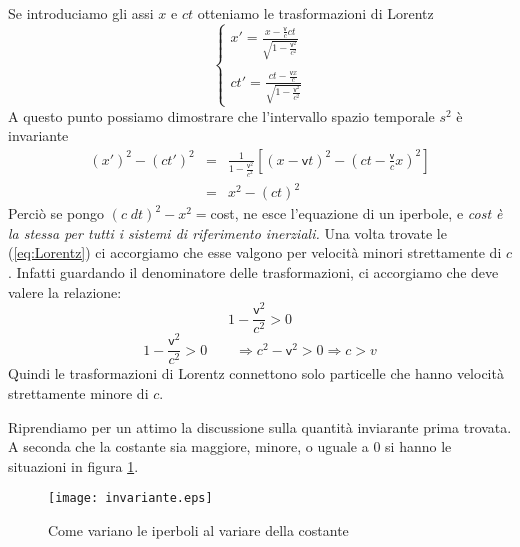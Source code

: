 Se introduciamo gli assi $x$ e $ct$ otteniamo le trasformazioni di
Lorentz 
\begin{equation}
  \left\{\begin{array}{l}
      x'=\frac{x-\frac{\mathsf{v}}{c}ct}{\sqrt{1-\frac{\mathsf{v}^2}{c^2}}}
      \\
      \mbox{ }\\
      ct'=\frac{ct-\frac{\mathsf{v}x}{c}}{\sqrt{1-\frac{\mathsf{v}^2}{c^2}}}
    \end{array}\right.\label{eq:Lorentz}
\end{equation}
A questo punto possiamo dimostrare che l'intervallo spazio temporale
$s^2$ \`e invariante
\begin{eqnarray*}
  (x')^2 - (ct')^2 & = &
  \frac{1}{1-\frac{\mathsf{v}^2}{c^2}}
  \left[(x-\mathsf{v}t)^2-(ct-\frac{\mathsf{v}}{c}x)^2\right]\\
  & = & x^2-(ct)^2
\end{eqnarray*}
Perci\`o se pongo $(c\;dt)^2-x^2=$cost, ne esce l'equazione di un
iperbole, e \emph{cost \`e la stessa per tutti i sistemi di
  riferimento inerziali.} Una volta trovate le (\ref{eq:Lorentz}) ci
accorgiamo che esse valgono per velocit\`a minori strettamente di
$c$. Infatti guardando il denominatore delle trasformazioni, ci
accorgiamo che deve valere la relazione:
\begin{displaymath}
  1-\frac{\mathsf{v}^2}{c^2}>0
\end{displaymath}
\begin{displaymath}
1-\frac{\mathsf{v}^2}{c^2}>0\qquad\Longrightarrow
c^2-\mathsf{v}^2>0\Longrightarrow c>v
\end{displaymath}
Quindi le trasformazioni di Lorentz
connettono solo particelle che hanno velocit\`a strettamente minore di
$c$.

Riprendiamo per un attimo la discussione sulla quantit\`a inviarante
prima trovata. A seconda che la costante sia maggiore, minore, o
uguale a $0$ si hanno le situazioni in figura
\ref{fig:iperboli}.\newline
\begin{figure}[tb]
  \begin{center}
      
    \texttt{[image: invariante.eps]}
    \caption{Come variano le iperboli al variare della costante}
    \label{fig:iperboli}
  \end{center}
\end{figure}


